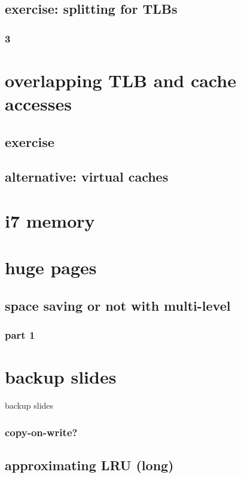 \subsection{exercise: splitting for TLBs}
\subsubsection{3}


\section{overlapping TLB and cache accesses}


\subsection{exercise}


\subsection{alternative: virtual caches}



\section{i7 memory}


\section{huge pages}


\subsection{space saving or not with multi-level}


\subsubsection{part 1}


\section{backup slides}
\begin{frame}{backup slides}
\end{frame}

\subsubsection{copy-on-write?} %


\subsection{approximating LRU (long)}



